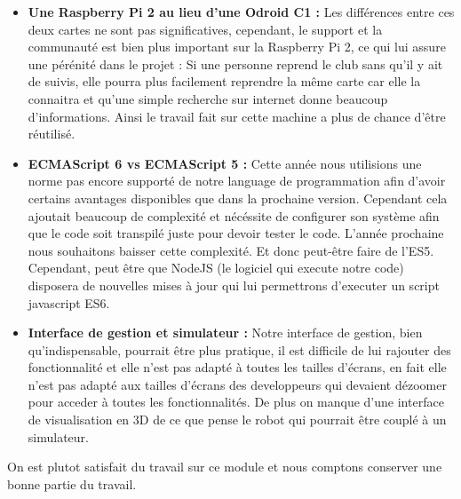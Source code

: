 	\begin{itemize}
		\item \textbf{Une Raspberry Pi 2 au lieu d'une Odroid C1 :} Les différences entre ces deux cartes ne sont pas significatives, cependant, le support et la communauté est bien plus important sur la Raspberry Pi 2, ce qui lui assure une pérénité dans le projet : Si une personne reprend le club sans qu'il y ait de suivis, elle pourra plus facilement reprendre la même carte car elle la connaitra et qu'une simple recherche sur internet donne beaucoup d'informations. Ainsi le travail fait sur cette machine a plus de chance d'être réutilisé.
		\item \textbf{ECMAScript 6 vs ECMAScript 5 :} Cette année nous utilisions une norme pas encore supporté de notre language de programmation afin d'avoir certains avantages disponibles que dans la prochaine version. Cependant cela ajoutait beaucoup de complexité et nécéssite de configurer son système afin que le code soit transpilé juste pour devoir tester le code. L'année prochaine nous souhaitons baisser cette complexité. Et donc peut-être faire de l'ES5. Cependant, peut être que NodeJS (le logiciel qui execute notre code) disposera de nouvelles mises à jour qui lui permettrons d'executer un script javascript ES6.
		\item \textbf{Interface de gestion et simulateur :} Notre interface de gestion, bien qu'indispensable, pourrait être plus pratique, il est difficile de lui rajouter des fonctionnalité et elle n'est pas adapté à toutes les tailles d'écrans, en fait elle n'est pas adapté aux tailles d'écrans des developpeurs qui devaient dézoomer pour acceder à toutes les fonctionnalités. De plus on manque d'une interface de visualisation en 3D de ce que pense le robot qui pourrait être couplé à un simulateur.
	\end{itemize}
	On est plutot satisfait du travail sur ce module et nous comptons conserver une bonne partie du travail.